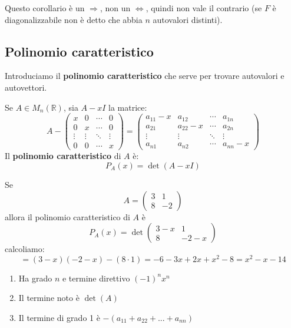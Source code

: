 \documentclass[
  a4paper,
]{article}
\providecommand{\tightlist}{%
  \setlength{\itemsep}{0pt}\setlength{\parskip}{0pt}}
\providecommand{\tightlist}{}
\begin{document}
\begin{notebox}
Questo corollario è un \(\Rightarrow\), non un \(\iff\), quindi non vale
il contrario (se \(F\) è diagonalizzabile non è detto che abbia \(n\)
autovalori distinti).
\end{notebox}

\hypertarget{polinomio-caratteristico}{%
\subsection{Polinomio caratteristico}\label{polinomio-caratteristico}}

Introduciamo il \textbf{polinomio caratteristico} che serve per trovare
autovalori e autovettori.

\begin{definitionbox}
Se \(A \in M_n(\mathbb{R})\), sia \(A - xI\) la matrice: \[
A -
\begin{pmatrix}
x & 0 & \cdots & 0\\
0 & x & \cdots & 0\\
\vdots & \vdots & \ddots & \vdots\\
0 & 0 & \cdots & x
\end{pmatrix}
= 
\begin{pmatrix}
a_{11}-x & a_{12} & \cdots & a_{1n}\\
a_{21} & a_{22}-x & \cdots & a_{2n}\\
\vdots & \vdots & \ddots & \vdots\\
a_{n1} & a_{n2} & \cdots & a_{nn}-x
\end{pmatrix}
\] Il \textbf{polinomio caratteristico} di \(A\) è: \[
P_A(x) = \det(A - xI)
\]
\end{definitionbox}

\begin{examplebox}
Se \[
A =
\begin{pmatrix}  
3 & 1 \\  
8 & -2  
\end{pmatrix}  
\] allora il polinomio caratteristico di \(A\) è \[
P_A(x) = \det
\begin{pmatrix}  
3 -x & 1 \\  
8 & -2  -x 
\end{pmatrix}  
\] calcoliamo: \[
=(3-x)(-2-x)-(8 \cdot 1) = -6 -3x + 2x + x^2 -8 = x^2 -x -14
\]
\end{examplebox}

\begin{propositionbox}
\begin{enumerate}
\def\labelenumi{\arabic{enumi}.}
\tightlist
\item
  Ha grado \(n\) e termine direttivo \((-1)^n x^n\)
\item
  Il termine noto è \(\det(A)\)
\item
  Il termine di grado 1 è \(-(a_{11} + a_{22} + ... + a_{nn})\)
\end{enumerate}
\end{propositionbox}
\end{document}
